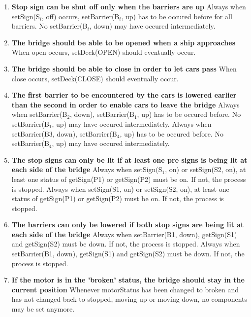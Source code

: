\begin{enumerate}
	\item \textbf{Stop sign can be shut off only when the barriers are up}
	Always when setSign(S$_i$, off) occurs, setBarrier(B$_i$, up) has to be occured before for all barriers. No setBarrier(B$_i$, down) may have occured intermediately.

	\item \textbf{The bridge should be able to be opened when a ship approaches}
	When open occurs, setDeck(OPEN) should eventually occur.

	\item \textbf{The bridge should be able to close in order to let cars pass}
	When close occurs, setDeck(CLOSE) should eventually occur.

	\item \textbf{The first barrier to be encountered by the cars is lowered earlier than the second in order to enable cars to leave the bridge}
	Always when setBarrier(B$_2$, down), setBarrier(B$_1$, up) has to be occured before. No setBarrier(B$_1$, up) may have occured intermediately.
	Always when setBarrier(B3, down), setBarrier(B$_4$, up) has to be occured before. No setBarrier(B$_4$, up) may have occured intermediately.
	
	\item \textbf{The stop signs can only be lit if at least one pre signs is being lit at each side of the bridge}
	Always when setSign(S$_1$, on) or setSign(S2, on), at least one status of getSign(P1) or getSign(P2) must be on. If not, the process is stopped.
	Always when setSign(S1, on) or setSign(S2, on), at least one status of getSign(P1) or getSign(P2) must be on. If not, the process is stopped.

	\item \textbf{The barriers can only be lowered if both stop signs are being lit at each side of the bridge}
	Always when setBarrier(B1, down), getSign(S1) and getSign(S2) must be down. If not, the process is stopped.
	Always when setBarrier(B1, down), getSign(S1) and getSign(S2) must be down. If not, the process is stopped.

	\item \textbf{If the motor is in the 'broken' status, the bridge should stay in the current position}
	Whenever motorStatus has been changed to broken and has not changed back to stopped, moving up or moving down, no components may be set anymore.

\end{enumerate}
